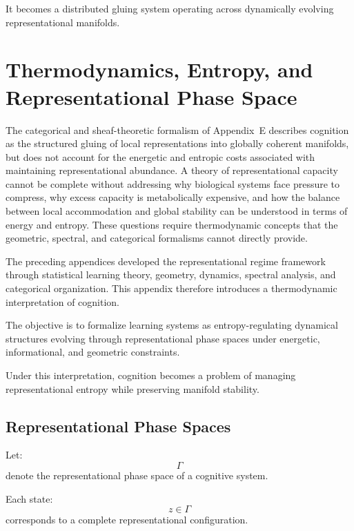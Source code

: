 \documentclass[12pt,a4paper]{article}
\begin{document}
It becomes a distributed gluing system operating across dynamically evolving representational manifolds.


\section{Thermodynamics, Entropy, and Representational Phase Space}

The categorical and sheaf-theoretic formalism of Appendix~E describes cognition as the structured gluing of local representations into globally coherent manifolds, but does not account for the energetic and entropic costs associated with maintaining representational abundance. A theory of representational capacity cannot be complete without addressing why biological systems face pressure to compress, why excess capacity is metabolically expensive, and how the balance between local accommodation and global stability can be understood in terms of energy and entropy. These questions require thermodynamic concepts that the geometric, spectral, and categorical formalisms cannot directly provide.

The preceding appendices developed the representational regime framework through statistical learning theory, geometry, dynamics, spectral analysis, and categorical organization. This appendix therefore introduces a thermodynamic interpretation of cognition.

The objective is to formalize learning systems as entropy-regulating dynamical structures evolving through representational phase spaces under energetic, informational, and geometric constraints.

Under this interpretation, cognition becomes a problem of managing representational entropy while preserving manifold stability.

\subsection{Representational Phase Spaces}

Let:
\[
\Gamma
\]
denote the representational phase space of a cognitive system.

Each state:
\[
z
\in
\Gamma
\]
corresponds to a complete representational configuration.
\end{document}
